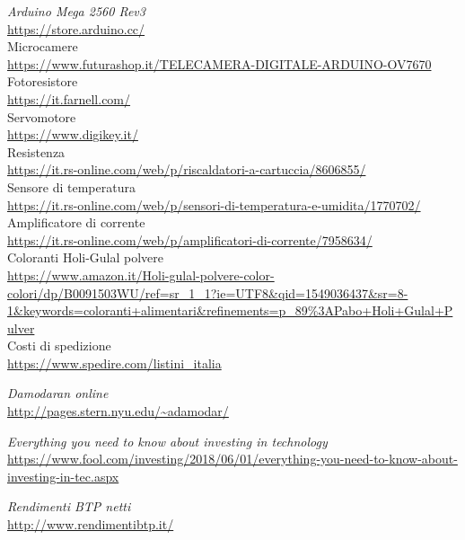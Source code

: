 \begin{thebibliography}{99}
\emph{Arduino Mega 2560 Rev3}\\
\url{https://store.arduino.cc/}
\\
Microcamere\\
\url{https://www.futurashop.it/TELECAMERA-DIGITALE-ARDUINO-OV7670}
\\
Fotoresistore\\
\url{https://it.farnell.com/}
\\
Servomotore\\
\url{https://www.digikey.it/}
\\
Resistenza\\
\url{https://it.rs-online.com/web/p/riscaldatori-a-cartuccia/8606855/}
\\
Sensore di temperatura\\
\url{https://it.rs-online.com/web/p/sensori-di-temperatura-e-umidita/1770702/}
\\
Amplificatore di corrente\\
\url{https://it.rs-online.com/web/p/amplificatori-di-corrente/7958634/}
\\
Coloranti Holi-Gulal polvere\\
\url{https://www.amazon.it/Holi-gulal-polvere-color-colori/dp/B0091503WU/ref=sr_1_1?ie=UTF8&qid=1549036437&sr=8-1&keywords=coloranti+alimentari&refinements=p_89%3APabo+Holi+Gulal+Pulver}
\\

Costi di spedizione\\
\url{https://www.spedire.com/listini_italia}

\emph{Damodaran online}\\
\url{http://pages.stern.nyu.edu/~adamodar/}

\emph{Everything you need to know about investing in technology }\\
\url{https://www.fool.com/investing/2018/06/01/everything-you-need-to-know-about-investing-in-tec.aspx}

\emph{Rendimenti BTP netti}\\
\url{http://www.rendimentibtp.it/}

\end{thebibliography}
